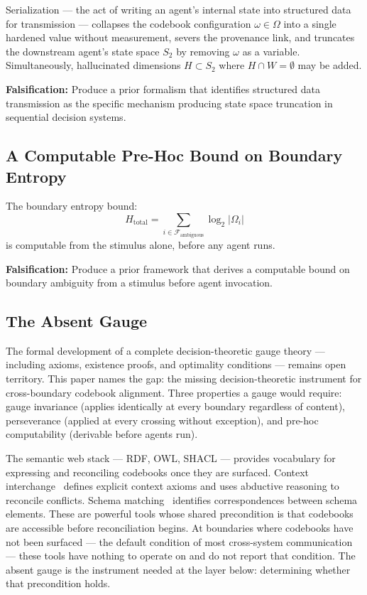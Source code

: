 \documentclass[11pt,a4paper]{article}
\begin{document}
Serialization --- the act of writing an agent's internal state into 
structured data for transmission --- collapses the codebook configuration 
$\omega \in \Omega$ into a single hardened value without measurement, 
severs the provenance link, and truncates the downstream agent's state 
space $S_2$ by removing $\omega$ as a variable. Simultaneously, 
hallucinated dimensions $H \subset S_2$ where $H \cap W = \emptyset$ 
may be added.

\textbf{Falsification:} Produce a prior formalism that identifies 
structured data transmission as the specific mechanism producing state 
space truncation in sequential decision systems.

\subsection{A Computable Pre-Hoc Bound on Boundary Entropy}

The boundary entropy bound:
\begin{equation}
    H_{\text{total}} = \sum_{i \in \mathcal{F}_{\text{ambiguous}}} 
    \log_2 |\Omega_i|
\end{equation}
is computable from the stimulus alone, before any agent runs.

\textbf{Falsification:} Produce a prior framework that derives a 
computable bound on boundary ambiguity from a stimulus before agent 
invocation.

\subsection{The Absent Gauge}

The formal development of a complete decision-theoretic gauge theory 
--- including axioms, existence proofs, and optimality conditions --- 
remains open territory. This paper names the gap: the missing 
decision-theoretic instrument for cross-boundary codebook alignment. 
Three properties a gauge would require: gauge invariance (applies 
identically at every boundary regardless of content), perseverance 
(applied at every crossing without exception), and pre-hoc 
computability (derivable before agents run).

The semantic web stack --- RDF, OWL, SHACL --- provides vocabulary 
for expressing and reconciling codebooks once they are surfaced. 
Context interchange~\cite{goh1999} defines explicit context axioms 
and uses abductive reasoning to reconcile conflicts. Schema 
matching~\cite{rahm2001} identifies correspondences between schema 
elements. These are powerful tools whose shared precondition is that 
codebooks are accessible before reconciliation begins. At boundaries 
where codebooks have not been surfaced --- the default condition of 
most cross-system communication --- these tools have nothing to 
operate on and do not report that condition. The absent gauge is the 
instrument needed at the layer below: determining whether that 
precondition holds.
\end{document}
